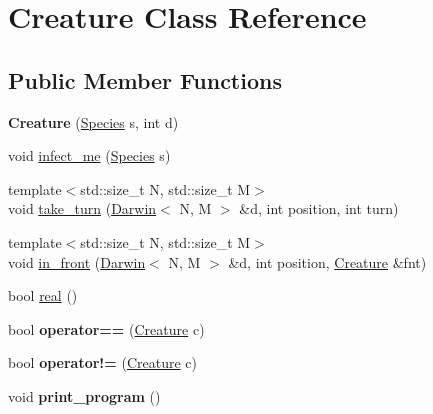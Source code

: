 \hypertarget{classCreature}{\section{Creature Class Reference}
\label{classCreature}
}
\subsection*{Public Member Functions}
\begin{DoxyCompactItemize}
\item 
\hypertarget{classCreature_a4f3236ca916953f3dedda46875a1386e}{{\bfseries Creature} (\hyperlink{classSpecies}{Species} s, int d)}\label{classCreature_a4f3236ca916953f3dedda46875a1386e}

\item 
void \hyperlink{classCreature_a71fcba906866260a1172036d7074c2c3}{infect\-\_\-me} (\hyperlink{classSpecies}{Species} s)
\item 
{\footnotesize template$<$std\-::size\-\_\-t N, std\-::size\-\_\-t M$>$ }\\void \hyperlink{classCreature_a858a868dd6b1e1bc529fe3a58451bbba}{take\-\_\-turn} (\hyperlink{classDarwin}{Darwin}$<$ N, M $>$ \&d, int position, int turn)
\item 
{\footnotesize template$<$std\-::size\-\_\-t N, std\-::size\-\_\-t M$>$ }\\void \hyperlink{classCreature_a597107fe6cc07e2bc31da65358eb5e45}{in\-\_\-front} (\hyperlink{classDarwin}{Darwin}$<$ N, M $>$ \&d, int position, \hyperlink{classCreature}{Creature} \&fnt)
\item 
bool \hyperlink{classCreature_aee075e42b38c6e82f8cb6ef652be4427}{real} ()
\item 
\hypertarget{classCreature_ab221cfcba3b7a44ec516bf57ef42a54c}{bool {\bfseries operator==} (\hyperlink{classCreature}{Creature} c)}\label{classCreature_ab221cfcba3b7a44ec516bf57ef42a54c}

\item 
\hypertarget{classCreature_acde8a07f27259e5a953fdeb68222f7f7}{bool {\bfseries operator!=} (\hyperlink{classCreature}{Creature} c)}\label{classCreature_acde8a07f27259e5a953fdeb68222f7f7}

\item 
\hypertarget{classCreature_a15c054611a8f6d5592a276e7640544e3}{void {\bfseries print\-\_\-program} ()}\label{classCreature_a15c054611a8f6d5592a276e7640544e3}

\end{DoxyCompactItemize}

